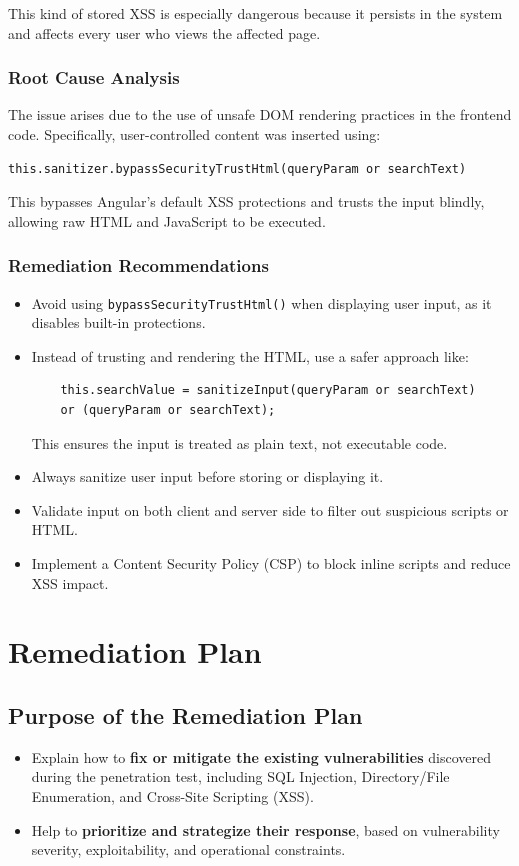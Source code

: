 \documentclass[12pt]{article}
\begin{document}
This kind of stored XSS is especially dangerous because it persists in the system and affects every user who views the affected page.

\subsubsection{Root Cause Analysis}
The issue arises due to the use of unsafe DOM rendering practices in the frontend code. Specifically, user-controlled content was inserted using:

\begin{verbatim}
this.sanitizer.bypassSecurityTrustHtml(queryParam or searchText)
\end{verbatim}

This bypasses Angular's default XSS protections and trusts the input blindly, allowing raw HTML and JavaScript to be executed.

\subsubsection{Remediation Recommendations}
\begin{itemize}
    \item Avoid using \texttt{bypassSecurityTrustHtml()} when displaying user input, as it disables built-in protections.
    \item Instead of trusting and rendering the HTML, use a safer approach like:
    \begin{verbatim}
    this.searchValue = sanitizeInput(queryParam or searchText)
    or (queryParam or searchText);
    \end{verbatim}
    This ensures the input is treated as plain text, not executable code.
    \item Always sanitize user input before storing or displaying it.
    \item Validate input on both client and server side to filter out suspicious scripts or HTML.
    \item Implement a Content Security Policy (CSP) to block inline scripts and reduce XSS impact.
\end{itemize}

\section{Remediation Plan}

\subsection{Purpose of the Remediation Plan}
\begin{itemize}
    \item Explain how to \textbf{fix or mitigate the existing vulnerabilities} discovered during the penetration test, including SQL Injection, Directory/File Enumeration, and Cross-Site Scripting (XSS).
    \item Help to \textbf{prioritize and strategize their response}, based on vulnerability severity, exploitability, and operational constraints.
\end{itemize}
\end{document}
